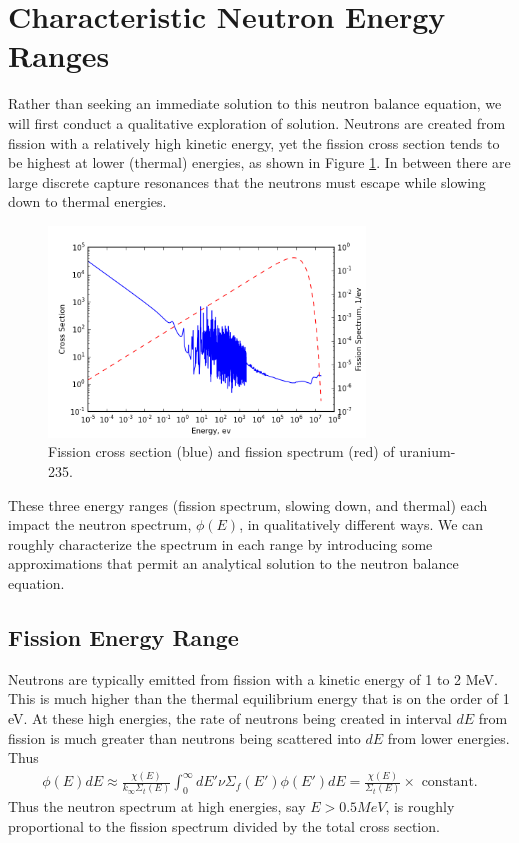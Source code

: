 \documentclass[11pt]{article}
\begin{document}
\section{Characteristic Neutron Energy Ranges}
\label{sec:orgheadline5}
Rather than seeking an immediate solution to this neutron balance equation, we will first conduct a qualitative exploration of solution.  Neutrons are created from fission with a relatively high kinetic energy, yet the fission cross section tends to be highest at lower (thermal) energies, as shown in Figure \ref{fig::u235fission}.  In between there are large discrete capture resonances that the neutrons must escape while slowing down to thermal energies.
\begin{figure}
  \centering
  \includegraphics[width=0.75\textwidth]{u235fission.png}
  \caption{Fission cross section (blue) and fission spectrum (red) of uranium-235.}
  \label{fig::u235fission}
\end{figure}

These three energy ranges (fission spectrum, slowing down, and thermal) each impact the neutron spectrum, \(\phi(E)\), in qualitatively different ways.  We can roughly characterize the spectrum in each range by introducing some approximations that permit an analytical solution to the neutron balance equation.
\subsection{Fission Energy Range}
\label{sec:orgheadline2}
Neutrons are typically emitted from fission with a kinetic energy of 1 to 2 MeV.  This is much higher than the thermal equilibrium energy that is on the order of 1 eV.  At these high energies, the rate of neutrons being created in interval \(dE\) from fission is much greater than neutrons being scattered into \(dE\) from lower energies.  Thus
\begin{align}
  \phi(E) dE \approx  \frac{\chi(E)}{k_\infty\Sigma_t(E)} \int_0^\infty dE' \nu\Sigma_f(E') \phi(E')  dE = \frac{\chi(E)}{\Sigma_t(E)} \times \text{ constant}.
\end{align}
Thus the neutron spectrum at high energies, say \(E > 0.5 MeV\), is roughly proportional to the fission spectrum divided by the total cross section.
\end{document}
